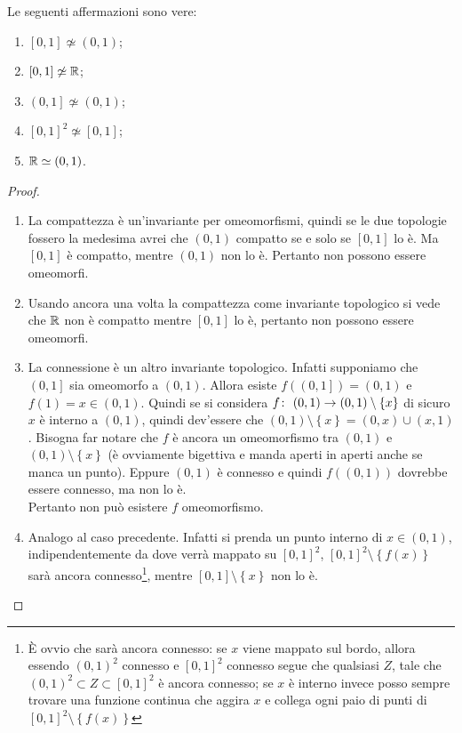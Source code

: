 \begin{theorem}
	Le seguenti affermazioni sono vere:
	\begin{enumerate}
		\item $\left[0,1\right] \not\simeq (0,1)$;
		\item $\left[0,1\right] \not\simeq \mathbb{R}$;
		\item $\left(0,1\right] \not\simeq (0,1)$;
		\item $\left[0,1\right]^2 \not\simeq \left[0,1\right]$;
		\item $\mathbb{R} \simeq (0,1)$.
	\end{enumerate}
\end{theorem}
\begin{proof}\
	\begin{enumerate}
		\item La compattezza è un'invariante per omeomorfismi, quindi se le due topologie fossero la medesima avrei che $(0,1)$ compatto se e solo se $\left[0,1\right]$ lo è. Ma $\left[0,1\right]$ è compatto, mentre $(0,1)$ non lo è. Pertanto non possono essere omeomorfi.
		\item Usando ancora una volta la compattezza come invariante topologico si vede che $\mathbb{R}$ non è compatto mentre $\left[0,1\right]$ lo è, pertanto non possono essere omeomorfi.
		\item La connessione è un altro invariante topologico. Infatti supponiamo che $\left(0,1\right]$ sia omeomorfo a $\left(0,1\right)$. Allora esiste $f(\left(0,1\right]) = \left(0,1\right)$ e $f(1) = x \in (0,1)$. Quindi se si considera $f \colon\ (0,1) \rightarrow (0,1)\setminus \left\{x\right\}$ di sicuro $x$ è interno a $(0,1)$, quindi dev'essere che $(0,1) \setminus \left\{x\right\} = (0, x) \cup (x, 1)$. Bisogna far notare che $f$ è ancora un omeomorfismo tra $(0,1)$ e $(0,1)\setminus \left\{x\right\}$ (è ovviamente bigettiva e manda aperti in aperti anche se manca un punto). Eppure $(0,1)$ è connesso e quindi $f((0,1))$ dovrebbe essere connesso, ma non lo è. \\ Pertanto non può esistere $f$ omeomorfismo.
		\item Analogo al caso precedente. Infatti si prenda un punto interno di $x \in (0,1)$, indipendentemente da dove verrà mappato su $\left[0,1\right]^2$, $\left[0,1\right]^2 \setminus \left\{f(x)\right\}$ sarà ancora connesso\footnote{È ovvio che sarà ancora connesso: se $x$ viene mappato sul bordo, allora essendo $(0,1)^2$ connesso e $\left[0,1\right]^2$ connesso segue che qualsiasi $Z$, tale che $(0,1)^2 \subset Z \subset \left[0,1\right]^2$ è ancora connesso; se $x$ è interno invece posso sempre trovare una funzione continua che aggira $x$ e collega ogni paio di punti di $\left[0,1\right]^2 \setminus \left\{f(x)\right\}$}, mentre $\left[0,1\right] \setminus \left\{x\right\}$ non lo è. 

\end{enumerate}
\end{proof}
